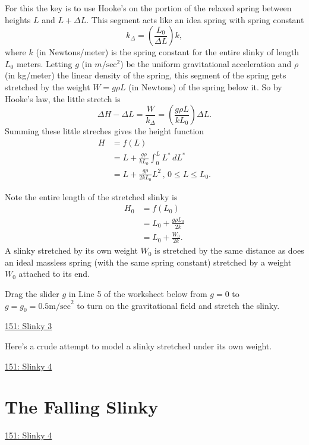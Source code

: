 \documentclass{ximera}
\begin{document}
For this the key is to use Hooke's on the portion of the relaxed spring between heights $L$ and $L+\Delta L$. This segment acts like an idea spring with spring constant
\[
        k_\Delta  =  \left( \frac{L_0}{\Delta L} \right) k,   
\]
where $k$ (in Newtons/meter) is the spring constant for the entire slinky of length $L_0$ meters. Letting $g$ (in $m/\text{sec}^2$) be the uniform gravitational acceleration and $\rho$ (in kg/meter) the linear density of the spring, this segment of the spring gets stretched by the weight $W =g \rho L$ (in Newtons) of the spring below it. So by Hooke's law, the little stretch is
\[
     \Delta H - \Delta L =  \frac{W}{k_\Delta} = \left( \frac{g\rho L}{k L_0} \right) \Delta L .
\]
Summing these little streches gives the height function
\begin{align*}
    H &= f(L)   \\
        &= L +  \frac{g\rho}{k L_0} \int_0^L L^* \, dL^* \\
         & = L + \frac{g\rho}{2kL_0}L^2 \, , \, 0\leq L \leq L_0 .
\end{align*}

Note the entire length of the stretched slinky is
\begin{align*}
   H_0 &= f(L_0)  \\
          &= L_0 + \frac{g\rho L_0}{2k} \\
          &= L_0 +  \frac{W_0}{2k}  .
\end{align*}
A slinky stretched by its own weight $W_0$ is stretched by the same distance as does an ideal massless spring (with the same spring constant) stretched by a weight $W_0$ attached to its end.



Drag the slider $g$ in Line 5 of the worksheet below from $g=0$ to $g=g_0 = 0.5 \text{m/sec}^2$ to turn on the gravitational field and stretch the slinky. 

\begin{onlineOnly}
    \begin{center}
\end{center}
\end{onlineOnly}

\href{https://www.desmos.com/calculator/vjjibjkdrz}{151: Slinky 3}

Here's a crude attempt to model a slinky stretched under its own weight.

\begin{onlineOnly}
    \begin{center}
\end{center}
\end{onlineOnly}

\href{https://www.desmos.com/calculator/o1ny9elbie}{151: Slinky 4}


\section{The Falling Slinky}

\begin{onlineOnly}
    \begin{center}
\end{center}
\end{onlineOnly}

\href{https://www.desmos.com/calculator/o1ny9elbie}{151: Slinky 4}
\end{document}

